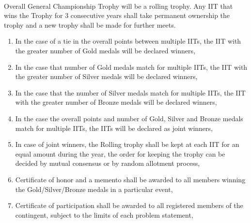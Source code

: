 
\paragraph{}
Overall General Championship Trophy will be a rolling trophy. Any IIT that wins the Trophy for 3 consecutive years shall take permanent ownership the trophy and a new trophy shall be made for further meets.

\begin{enumerate}
    \item In the case of a tie in the overall points between multiple IITs, the IIT with the greater number of Gold medals will be declared winners,
    \item In the case that number of Gold medals match for multiple IITs, the IIT with the greater number of Silver medals will be declared winners,
    \item In the case that the number of Silver medals match for multiple IITs, the IIT with the greater number of Bronze medals will be declared winners,
    \item In the case the overall points and number of Gold, Silver and Bronze medals match for multiple IITs, the IITs will be declared as joint winners,
    \item In case of joint winners, the Rolling trophy shall be kept at each IIT for an equal amount during the year, the order for keeping the trophy can be decided by mutual consensus or by random allotment process,
    \item Certificate of honor and a memento shall be awarded to all members winning the Gold/Silver/Bronze medals in a particular event,
    \item Certificate of participation shall be awarded to all registered members of the contingent, subject to the limits of each problem statement,
\end{enumerate}
